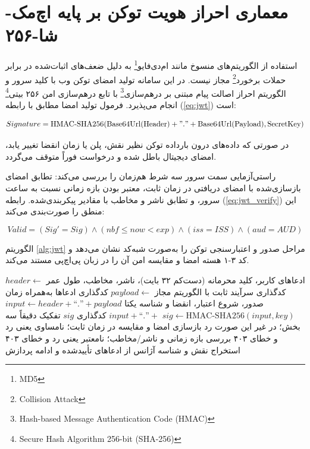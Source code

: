 \documentclass[11pt, a4paper]{report}
\newcommand{\enfootnote}[1]{\footnote{\foreignlanguage{english}{#1}}}
\begin{document}
\section{معماری احراز هویت توکن بر پایه اچ‌مک-شا-۲۵۶}
استفاده از الگوریتم‌های منسوخ مانند ام‌دی‌فایو\enfootnote{MD5} به دلیل ضعف‌های اثبات‌شده در برابر حملات برخورد\enfootnote{Collision Attack} مجاز نیست. در این سامانه تولید امضای توکن وب با کلید سرور و الگوریتم احراز اصالت پیام مبتنی بر درهم‌سازی\enfootnote{Hash-based Message Authentication Code (HMAC)} با تابع درهم‌سازی امن ۲۵۶ بیتی\enfootnote{Secure Hash Algorithm 256-bit (SHA-256)} انجام می‌پذیرد. فرمول تولید امضا مطابق با رابطه (\ref{eq:jwt}) است:

\begin{equation}
    Signature = \text{HMAC-SHA256}(\text{Base64Url}(\text{Header}) + "." + \text{Base64Url}(\text{Payload}), \text{SecretKey})
    \label{eq:jwt}
\end{equation}

در صورتی که داده‌های درون بارداده توکن نظیر نقش، پلن یا زمان انقضا تغییر یابد، امضای دیجیتال باطل شده و درخواست فوراً متوقف می‌گردد.

راستی‌آزمایی سمت سرور سه شرط هم‌زمان را بررسی می‌کند: تطابق امضای بازسازی‌شده با امضای دریافتی در زمان ثابت، معتبر بودن بازه زمانی نسبت به ساعت سرور، و تطابق ناشر و مخاطب با مقادیر پیکربندی‌شده. رابطه (\ref{eq:jwt_verify}) این منطق را صورت‌بندی می‌کند:

\begin{equation}
    Valid = (Sig' = Sig) \land (nbf \le now < exp) \land (iss = ISS) \land (aud = AUD)
    \label{eq:jwt_verify}
\end{equation}

الگوریتم \ref{alg:jwt} مراحل صدور و اعتبارسنجی توکن را به‌صورت شبه‌کد نشان می‌دهد و کد ۳-۱ هسته امضا و مقایسه امن آن را در زبان پی‌اچ‌پی مستند می‌کند.

\begin{algorithm}[htbp]
\caption{صدور و اعتبارسنجی توکن وب جیسون با اچ‌مک-شا-۲۵۶}
\label{alg:jwt}
\begin{algorithmic}[1]
\REQUIRE ادعاهای کاربر، کلید محرمانه (دست‌کم ۳۲ بایت)، ناشر، مخاطب، طول عمر
\STATE $header \gets$ کدگذاری سرآیند ثابت با الگوریتم مجاز
\STATE $payload \gets$ کدگذاری ادعاها به‌همراه زمان صدور، شروع اعتبار، انقضا و شناسه یکتا
\STATE $input \gets header + \text{``.''} + payload$
\STATE $sig \gets \text{HMAC-SHA256}(input, key)$
\STATE \RETURN $input + \text{``.''} +$ کدگذاری $sig$
\STATE {} تفکیک دقیقاً سه بخش؛ در غیر این صورت رد
\STATE بازسازی امضا و مقایسه در زمان ثابت؛ نامساوی یعنی رد و خطای ۴۰۳
\STATE بررسی بازه زمانی و ناشر/مخاطب؛ نامعتبر یعنی رد و خطای ۴۰۳
\STATE استخراج نقش و شناسه آژانس از ادعاهای تأییدشده و ادامه پردازش
\end{algorithmic}
\end{algorithm}
\end{document}
